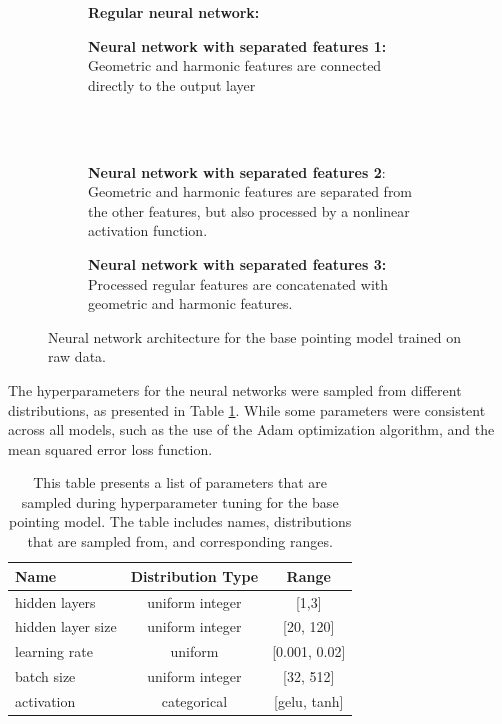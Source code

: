 \begin{figure}[H]
    \centering
    \begin{subfigure}[t]{0.49\textwidth}
        \centering
        
        \caption{\textbf{Regular neural network:}}
        \label{subfig:cm_dt}
    \end{subfigure}
    \hfill
   \begin{subfigure}[t]{0.49\textwidth}
       \centering
       
       \caption{\textbf{Neural network with separated features 1:} Geometric and harmonic features are connected directly to the output layer}
       \label{subfig:cm_rf}
\end{subfigure}
\\~\\
    \begin{subfigure}[t]{0.49\textwidth}
        \centering
        
        \caption{\textbf{Neural network with separated features 2}: Geometric and harmonic features are separated from the other features, but also processed by a nonlinear activation function.}
        \label{subfig:cm_bag}
    \end{subfigure}
    \hfill
       \begin{subfigure}[t]{0.49\textwidth}
        \centering
        
        \caption{\textbf{Neural network with separated features 3:} Processed regular features are concatenated with geometric and harmonic features.}
        \label{subfig:cm_bos}
    \end{subfigure}
     \caption{Neural network architecture for the base pointing model trained on raw data.}
     \label{fig:nn_architecture}
\end{figure}

The hyperparameters for the neural networks were sampled from different distributions, as presented in Table \ref{tab:nn_hyperparameters}.
While some parameters were consistent across all models, such as the use of the Adam optimization algorithm, and the mean squared error loss function.



\begin{table}[H]
    \centering
    \caption{This table presents a list of parameters that are sampled during hyperparameter tuning for the base pointing model. The table includes names, distributions that are sampled from, and corresponding ranges.}
    \begin{tabular}{lcc}
    \hline
    \textbf{Name} & \textbf{Distribution Type} & \textbf{Range} \\ \hline
    hidden layers & uniform integer & [1,3] \\
    hidden layer size & uniform integer & [20, 120] \\
    learning rate & uniform & [0.001, 0.02] \\
    batch size & uniform integer & [32, 512] \\
    activation & categorical & [gelu, tanh] \\ \hline
    \end{tabular}
    \label{tab:nn_hyperparameters}
    \end{table}
